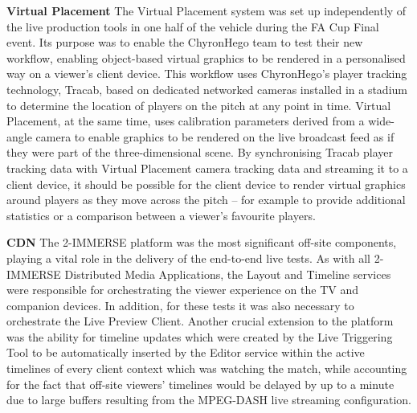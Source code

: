 \documentclass[sigchi-a, authorversion]{acmart}
\begin{document}
\textbf{Virtual Placement} The Virtual Placement system was set up independently of the live production tools in one half of the vehicle during the FA Cup Final event. Its purpose was to enable the ChyronHego team to test their new workflow, enabling object-based virtual graphics to be rendered in a personalised way on a viewer's client device. This workflow uses ChyronHego's player tracking technology, Tracab, based on dedicated networked cameras installed in a stadium to determine the location of players on the pitch at any point in time. Virtual Placement, at the same time, uses calibration parameters derived from a wide-angle camera to enable graphics to be rendered on the live broadcast feed as if they were part of the three-dimensional scene. By synchronising Tracab player tracking data with Virtual Placement camera tracking data and streaming it to a client device, it should be possible for the client device to render virtual graphics around players as they move across the pitch – for example to provide additional statistics or a comparison between a viewer’s favourite players.

\textbf{CDN} The 2-IMMERSE platform \cite{kegel2017} was the most significant off-site components, playing a vital role in the delivery of the end-to-end live tests. As with all 2-IMMERSE Distributed Media Applications, the Layout and Timeline services were responsible for orchestrating the viewer experience on the TV and companion devices. In addition, for these tests it was also necessary to orchestrate the Live Preview Client. Another crucial extension to the platform was the ability for timeline updates which were created by the Live Triggering Tool to be automatically inserted by the Editor service within the active timelines of every client context which was watching the match, while accounting for the fact that off-site viewers' timelines would be delayed by up to a minute due to large buffers resulting from the MPEG-DASH live streaming configuration.

\end{document}
